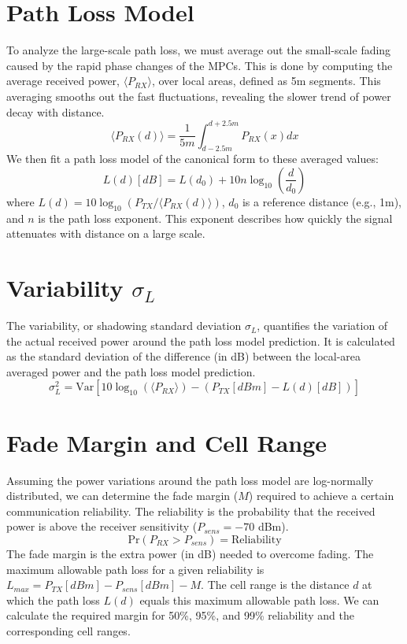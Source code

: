 \section{Path Loss Model}
To analyze the large-scale path loss, we must average out the small-scale fading caused by the rapid phase changes of the MPCs. This is done by computing the average received power, $\langle P_{RX} \rangle$, over local areas, defined as 5m segments. This averaging smooths out the fast fluctuations, revealing the slower trend of power decay with distance.
\begin{equation}
	\langle P_{RX}(d) \rangle = \frac{1}{5m} \int_{d-2.5m}^{d+2.5m} P_{RX}(x) dx
\end{equation}
We then fit a path loss model of the canonical form to these averaged values:
\begin{equation}
	L(d) [dB] = L(d_0) + 10n \log_{10}\left(\frac{d}{d_0}\right)
\end{equation}
where $L(d) = 10 \log_{10}(P_{TX} / \langle P_{RX}(d) \rangle)$, $d_0$ is a reference distance (e.g., 1m), and $n$ is the path loss exponent. This exponent describes how quickly the signal attenuates with distance on a large scale.

\section{Variability $\sigma_L$}
The variability, or shadowing standard deviation $\sigma_L$, quantifies the variation of the actual received power around the path loss model prediction. It is calculated as the standard deviation of the difference (in dB) between the local-area averaged power and the path loss model prediction.
\begin{equation}
	\sigma_L^2 = \text{Var} \left[ 10\log_{10}(\langle P_{RX} \rangle) - (P_{TX}[dBm] - L(d)[dB]) \right]
\end{equation}

\section{Fade Margin and Cell Range}
Assuming the power variations around the path loss model are log-normally distributed, we can determine the fade margin ($M$) required to achieve a certain communication reliability. The reliability is the probability that the received power is above the receiver sensitivity ($P_{sens} = -70$ dBm).
\begin{equation}
	\text{Pr}(P_{RX} > P_{sens}) = \text{Reliability}
\end{equation}
The fade margin is the extra power (in dB) needed to overcome fading. The maximum allowable path loss for a given reliability is $L_{max} = P_{TX}[dBm] - P_{sens}[dBm] - M$. The cell range is the distance $d$ at which the path loss $L(d)$ equals this maximum allowable path loss. We can calculate the required margin for 50\%, 95\%, and 99\% reliability and the corresponding cell ranges.

